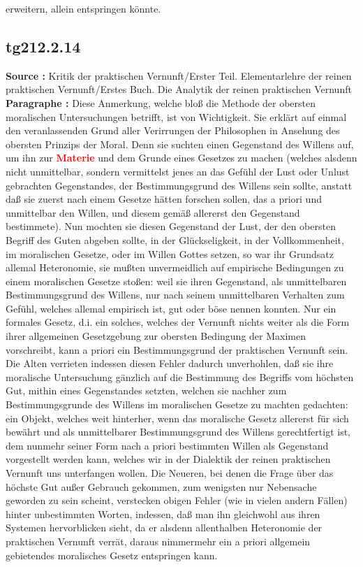 \documentclass[a4paper,12pt,twoside]{book}
\newcommand{\match}[1]{\textcolor{red}{\textbf{#1}}}
\begin{document}
erweitern, allein entspringen könnte. 
	
	\subsection*{tg212.2.14} 
	\textbf{Source : }Kritik der praktischen Vernunft/Erster Teil. Elementarlehre der reinen praktischen Vernunft/Erstes Buch. Die Analytik der reinen praktischen Vernunft\\  
	
	\noindent\textbf{Paragraphe : }Diese Anmerkung, welche bloß die Methode der obersten moralischen Untersuchungen betrifft, ist von Wichtigkeit. Sie erklärt auf einmal den veranlassenden Grund aller Verirrungen der Philosophen in Ansehung des obersten Prinzips der Moral. Denn sie suchten einen Gegenstand des Willens auf, um ihn zur \match{Materie} und dem Grunde eines Gesetzes zu machen (welches alsdenn nicht unmittelbar, sondern vermittelst jenes an das Gefühl der Lust oder Unlust gebrachten Gegenstandes, der Bestimmungsgrund des Willens sein sollte, anstatt daß sie zuerst nach einem Gesetze hätten forschen sollen, das a priori und unmittelbar den Willen, und diesem gemäß allererst den Gegenstand bestimmete). Nun mochten sie diesen Gegenstand der Lust, der den obersten Begriff des Guten abgeben sollte, in der Glückseligkeit, in der Vollkommenheit, im moralischen Gesetze, oder im Willen Gottes setzen, so war ihr Grundsatz allemal Heteronomie, sie mußten unvermeidlich auf empirische Bedingungen zu einem moralischen Gesetze stoßen: weil sie ihren Gegenstand, als unmittelbaren Bestimmungsgrund des Willens, nur nach seinem unmittelbaren Verhalten zum Gefühl, welches allemal empirisch ist, gut oder böse nennen konnten. Nur ein formales Gesetz, d.i. ein solches, welches der Vernunft nichts weiter als die Form ihrer allgemeinen Gesetzgebung zur obersten Bedingung der Maximen vorschreibt, kann a priori ein Bestimmungsgrund der praktischen Vernunft sein. Die Alten verrieten indessen diesen Fehler dadurch unverhohlen, daß sie ihre moralische Untersuchung gänzlich auf die Bestimmung des Begriffs vom höchsten Gut, mithin eines Gegenstandes setzten, welchen sie nachher zum Bestimmungsgrunde des Willens im moralischen  Gesetze zu machten gedachten: ein Objekt, welches weit hinterher, wenn das moralische Gesetz allererst für sich bewährt und als unmittelbarer Bestimmungsgrund des Willens gerechtfertigt ist, dem nunmehr seiner Form nach a priori bestimmten Willen als Gegenstand vorgestellt werden kann, welches wir in der Dialektik der reinen praktischen Vernunft uns unterfangen wollen. Die Neueren, bei denen die Frage über das höchste Gut außer Gebrauch gekommen, zum wenigsten nur Nebensache geworden zu sein scheint, verstecken obigen Fehler (wie in vielen andern Fällen) hinter unbestimmten Worten, indessen, daß man ihn gleichwohl aus ihren Systemen hervorblicken sieht, da er alsdenn allenthalben Heteronomie der praktischen Vernunft verrät, daraus nimmermehr ein a priori allgemein gebietendes moralisches Gesetz entspringen kann. 
	
\end{document}
